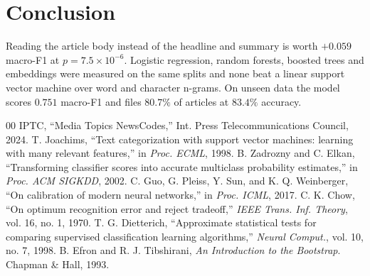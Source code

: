 \documentclass[conference]{IEEEtran}
\begin{document}
\section{Conclusion}

Reading the article body instead of the headline and summary is worth $+0.059$ macro-F1
at $p = 7.5\times10^{-6}$. Logistic regression, random forests, boosted trees and
embeddings were measured on the same splits and none beat a linear support vector machine
over word and character n-grams. On unseen data the model scores $0.751$ macro-F1 and
files $80.7\%$ of articles at $83.4\%$ accuracy.
\scriptsize
\begin{thebibliography}{00}
 IPTC, ``Media Topics NewsCodes,'' Int. Press Telecommunications Council, 2024.
 T. Joachims, ``Text categorization with support vector machines: learning with many relevant features,'' in \textit{Proc. ECML}, 1998.
 B. Zadrozny and C. Elkan, ``Transforming classifier scores into accurate multiclass probability estimates,'' in \textit{Proc. ACM SIGKDD}, 2002.
 C. Guo, G. Pleiss, Y. Sun, and K. Q. Weinberger, ``On calibration of modern neural networks,'' in \textit{Proc. ICML}, 2017.
 C. K. Chow, ``On optimum recognition error and reject tradeoff,'' \textit{IEEE Trans. Inf. Theory}, vol. 16, no. 1, 1970.
 T. G. Dietterich, ``Approximate statistical tests for comparing supervised classification learning algorithms,'' \textit{Neural Comput.}, vol. 10, no. 7, 1998.
 B. Efron and R. J. Tibshirani, \textit{An Introduction to the Bootstrap}. Chapman \& Hall, 1993.
\end{thebibliography}
\end{document}
